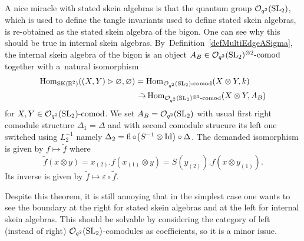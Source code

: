 \documentclass[pdftex]{sigma}%
\numberwithin{equation}{section}
\newcommand{\Hom}{\operatorname{Hom}}
\newcommand{\Oqcom}{\Oq\text{-}{\rm comod}}
\newcommand{\Oq}{\mathcal{O}_{q^2}({\rm SL}_2)}
\begin{document}
\begin{Remark}
A nice miracle with stated skein algebras is that the quantum group $\Oq$, which is used to define the tangle invariants used to define stated skein algebras, is re-obtained as the stated skein algebra of the bigon. One can see why this should be true in internal skein algebras. By~Defi\-ni\-tion~\ref{defMultiEdgeASigma}, the internal skein algebra of the bigon is an object $A_B \in \Oq^{\otimes 2}\text{-}{\rm comod}$ together with a~natural isomorphism
\begin{align*}
\Hom_{{\rm SK}(\mathbb{R}^2)}((X,Y)\rhd\varnothing,\varnothing) & = \Hom_{\Oqcom}(X\otimes Y,k) \\
& \ \tilde{\to} \Hom_{\Oq^{\otimes 2}\text{-}{\rm comod}}(X \otimes Y,A_B)
\end{align*}
 for $X,Y\in\Oqcom$. We set $A_B = \Oq$ with usual first right comodule structure $\Delta_1=\Delta$ and with second comodule strucure its left one switched using $L_2^{-1}$ namely $\Delta_2=\operatorname{fl}\circ\big(S^{-1}\otimes {\rm Id}\big)\circ \Delta$. The demanded isomorphism is given by $f\mapsto \tilde{f}$ where \[
 \tilde{f}(x\otimes y)= x_{(2)}. f(x_{(1)}\otimes y) = S(y_{(2)}). f(x\otimes y_{(1)}).
 \]
  Its inverse is given by $\tilde{f}\mapsto \varepsilon \circ \tilde{f}$.
\end{Remark}

\begin{Remark}\label{rmkPbComRightActLeft}
Despite this theorem, it is still annoying that in the simplest case one wants to see the boundary at the right for stated skein algebras and at the left for internal skein algebras. This should be solvable by considering the category of left (instead of right) $\Oq$-comodules as coefficients, so it is a minor issue.
\end{Remark}
\end{document}
